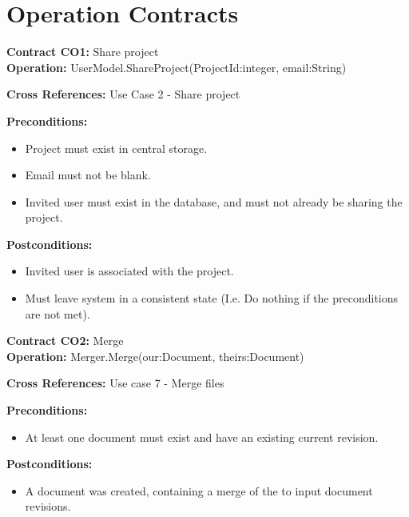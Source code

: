 \section{Operation Contracts}
\label{sec:operation-contracts}

\textbf{Contract CO1:} Share project \\

\textbf{Operation:} UserModel.ShareProject(ProjectId:integer, email:String)

\textbf{Cross References:} Use Case 2 - Share project

\textbf{Preconditions:} 

\begin{itemize}

    \item Project must exist in central storage.

    \item Email must not be blank.

    \item Invited user must exist in the database, and must not already be sharing the project.

\end{itemize}

\textbf{Postconditions:}

\begin{itemize}

    \item Invited user is associated with the project.

    \item Must leave system in a consistent state (I.e. Do nothing if the preconditions are not met).

\end{itemize}


\noindent \textbf{Contract CO2:} Merge \\

\textbf{Operation:} Merger.Merge(our:Document, theirs:Document)

\textbf{Cross References:} Use case 7 - Merge files

\textbf{Preconditions:}

\begin{itemize}
    \item At least one document must exist and have an existing current revision.
\end{itemize}

\textbf{Postconditions:}

\begin{itemize}
    \item A document was created, containing a merge of the to input document revisions.
\end{itemize}

